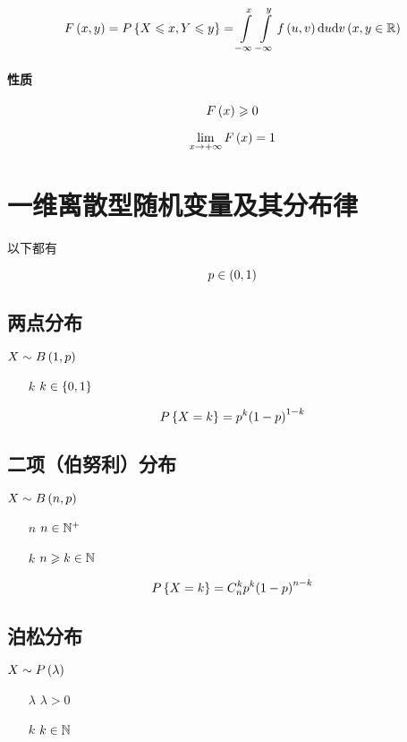 \documentclass{article}
\begin{document}
\[F\left(x,y\right)=P\left\{X\leqslant x,Y\leqslant y\right\}=\int\limits_{-\infty}^x\int\limits_{-\infty}^yf\left(u,v\right)\mathrm d u\mathrm d v\left(x,y\in\mathbb R\right)\]

\paragraph{性质}

\[F\left(x\right)\geqslant0\]

\[\lim_{x\to+\infty}F\left(x\right)=1\]

\section{一维离散型随机变量及其分布律}

以下都有

\[p\in\left(0,1\right)\]

\subsection{两点分布}

$X\sim B\left(1,p\right)$

\begin{enumerate}
    \item [$k$] $k\in\left\{0,1\right\}$
\end{enumerate}

\[P\left\{X=k\right\}=p^k{\left(1-p\right)}^{1-k}\]

\subsection{二项（伯努利）分布}

$X\sim B\left(n,p\right)$

\begin{enumerate}
    \item [$n$] $n\in\mathbb N^+$
    \item [$k$] $n\geqslant k\in\mathbb N$
\end{enumerate}

\[P\left\{X=k\right\}=C_n^kp^k{\left(1-p\right)}^{n-k}\]

\subsection{泊松分布}

$X\sim P\left(\lambda\right)$

\begin{enumerate}
    \item [$\lambda$] $\lambda>0$
    \item [$k$] $k\in\mathbb N$
\end{enumerate}
\end{document}
